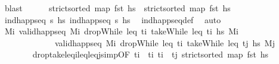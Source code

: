 \begin{isabellebody}
\ blast\isanewline
\ \ \ \ \isamarkupfalse%
\ {\isachardoublequoteopen}strict{\isacharunderscore}{\kern0pt}sorted\ {\isacharparenleft}{\kern0pt}map\ fst\ hs\ \ {\isachardoublequoteopen}strict{\isacharunderscore}{\kern0pt}sorted\ {\isacharparenleft}{\kern0pt}map\ fst\ hs\isanewline
\ \ \ \ \ \ \isamarkupfalse%
\ {\isacartoucheopen}ind{\isacharunderscore}{\kern0pt}happ{\isacharunderscore}{\kern0pt}seq\ {\isasympi}s\ hs\ {\isacartoucheopen}ind{\isacharunderscore}{\kern0pt}happ{\isacharunderscore}{\kern0pt}seq\ {\isasympi}s\ hs\ \isamarkupfalse%
\ ind{\isacharunderscore}{\kern0pt}happ{\isacharunderscore}{\kern0pt}seq{\isacharunderscore}{\kern0pt}def\ \isamarkupfalse%
\ auto\isanewline
\ \ \ \ \isamarkupfalse%
\ {\isachardoublequoteopen}{\isasymexists}M\isactrlsub i{\isacharprime}{\kern0pt}{\isachardot}{\kern0pt}\ valid{\isacharunderscore}{\kern0pt}happ{\isacharunderscore}{\kern0pt}seq\ M\isactrlsub i\ {\isacharparenleft}{\kern0pt}dropWhile\ {\isacharparenleft}{\kern0pt}leq\ t\isactrlsub i{\isacharparenright}{\kern0pt}\ {\isacharparenleft}{\kern0pt}takeWhile\ {\isacharparenleft}{\kern0pt}leq\ t\isactrlsub i{\isacharprime}{\kern0pt}{\isacharparenright}{\kern0pt}\ hs\ M\isactrlsub i{\isacharprime}{\kern0pt}\ \isanewline
\ \ \ \ \ \ \ \ \ \ \ \ {\isasymand}\ valid{\isacharunderscore}{\kern0pt}happ{\isacharunderscore}{\kern0pt}seq\ M\isactrlsub i{\isacharprime}{\kern0pt}\ {\isacharparenleft}{\kern0pt}dropWhile\ {\isacharparenleft}{\kern0pt}leq\ t\isactrlsub i{\isacharprime}{\kern0pt}{\isacharparenright}{\kern0pt}\ {\isacharparenleft}{\kern0pt}takeWhile\ {\isacharparenleft}{\kern0pt}leq\ t\isactrlsub j{\isacharparenright}{\kern0pt}\ hs\ M\isactrlsub j{\isachardoublequoteclose}\isanewline
\ \ \ \ \ \ \isamarkupfalse%
\ drop{\isacharunderscore}{\kern0pt}take{\isacharunderscore}{\kern0pt}leq\isactrlsub i{\isacharunderscore}{\kern0pt}leq{\isacharunderscore}{\kern0pt}leq\isactrlsub j{\isacharunderscore}{\kern0pt}simp{\isacharbrackleft}{\kern0pt}OF\ {\isacartoucheopen}t\isactrlsub i\ {\isasymle}\ t\isactrlsub i{\isacharprime}{\kern0pt}{\isacartoucheclose}\ {\isacartoucheopen}t\isactrlsub i{\isacharprime}{\kern0pt}\ {\isasymle}\ t\isactrlsub j{\isacartoucheclose}\ {\isacartoucheopen}strict{\isacharunderscore}{\kern0pt}sorted\ {\isacharparenleft}{\kern0pt}map\ fst\ hs\isanewline

\end{isabellebody}

